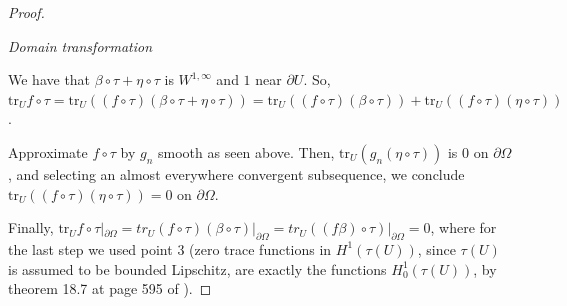\documentclass[english,a4paper,10pt,oneside]{scrbook}	%
\theoremstyle{break}
\newenvironment{mproof}[1][\proofname]{%
  \begin{proof}[#1]$ $\par\nobreak\ignorespaces
}{%
  \end{proof}
}
\renewcommand*{\proofname}{Proof}
\theoremstyle{remark}
\newcommand{\tr}{\text{tr}}
\begin{document}
\begin{appendices}
\begin{mproof}
%

\textit{Domain transformation}


We have that $\beta \circ \tau +  \eta \circ \tau$ is $W^{1,\infty}$ and $1$ near $\partial U$. 
So, $\tr_U f\circ \tau = \tr_U ((f\circ \tau)(\beta \circ \tau +  \eta \circ \tau) )= \tr_U ((f\circ \tau)(\beta \circ \tau)) + \tr_U ((f\circ \tau )( \eta \circ \tau))$.

Approximate $f\circ \tau$ by $g_n$ smooth as seen above.  Then, $\tr_U (g_n( \eta \circ \tau))$ is $0$ on $\partial \Omega$ , and  selecting an almost everywhere convergent subsequence, we conclude $\tr_U ((f\circ \tau)( \eta \circ \tau)) = 0$ on $\partial \Omega$. 

Finally, $\tr_U f\circ \tau|_{\partial \Omega} = tr_U (f\circ \tau)(\beta \circ \tau)|_{\partial \Omega} =  tr_U ((f\beta) \circ \tau)|_{\partial \Omega}= 0$, where for the last step we used point $3$ (zero trace functions in $H^1(\tau(U))$, since $\tau(U)$ is assumed to be bounded Lipschitz, are exactly the functions $H^1_0(\tau(U))$, by theorem 18.7 at page 595 of \cite{leoni}).
\end{mproof}


\end{appendices}
\end{document}
